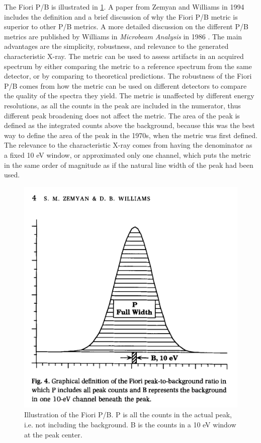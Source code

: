 The Fiori P/B is illustrated in \cref{fig:fiori_pb}.
A paper from Zemyan and Williams in 1994 \cite{zemyan_standard_performance_1994} includes the definition and a brief discussion of why the Fiori P/B metric is superior to other P/B metrics.
A more detailed discussion on the different P/B metrics are published by Williams in \emph{Microbeam Analysis} in 1986 \cite{williams_standard_definitions_1986}.
The main advantages are the simplicity, robustness, and relevance to the generated characteristic X-ray.
The metric can be used to assess artifacts in an acquired spectrum by either comparing the metric to a reference spectrum from the same detector, or by comparing to theoretical predictions.
The robustness of the Fiori P/B comes from how the metric can be used on different detectors to compare the quality of the spectra they yield.
The metric is unaffected by different energy resolutions, as all the counts in the peak are included in the numerator, thus different peak broadening does not affect the metric.
The area of the peak is defined as the integrated counts above the background, because this was the best way to define the area of the peak in the 1970s, when the metric was first defined.
The relevance to the characteristic X-ray comes from having the denominator as a fixed 10 eV window, or approximated only one channel, which puts the metric in the same order of magnitude as if the natural line width of the peak had been used.




\begin{figure}
    \centering
    \includegraphics[width=0.6\linewidth]{figures/FioriPB_TODO_remake.png}
    \caption{Illustration of the Fiori P/B.
        P is all the counts in the actual peak, i.e. not including the background.
        B is the counts in a 10 eV window at the peak center.
        }
    \label{fig:fiori_pb}
\end{figure}

